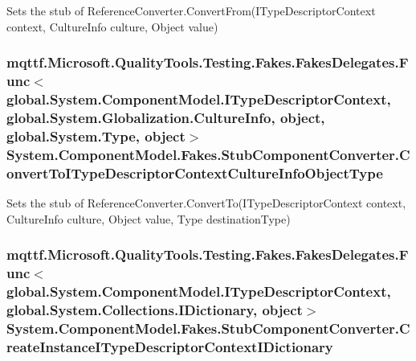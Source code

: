 Sets the stub of Reference\-Converter.\-Convert\-From(\-I\-Type\-Descriptor\-Context context, Culture\-Info culture, Object value)

\hypertarget{class_system_1_1_component_model_1_1_fakes_1_1_stub_component_converter_ae0655af312b0b7d0d8d744f84c0ad83b}{
\subsubsection[{Convert\-To\-I\-Type\-Descriptor\-Context\-Culture\-Info\-Object\-Type}]{\setlength{\rightskip}{0pt plus 5cm}mqttf.\-Microsoft.\-Quality\-Tools.\-Testing.\-Fakes.\-Fakes\-Delegates.\-Func$<$global.\-System.\-Component\-Model.\-I\-Type\-Descriptor\-Context, global.\-System.\-Globalization.\-Culture\-Info, object, global.\-System.\-Type, object$>$ System.\-Component\-Model.\-Fakes.\-Stub\-Component\-Converter.\-Convert\-To\-I\-Type\-Descriptor\-Context\-Culture\-Info\-Object\-Type}}\label{class_system_1_1_component_model_1_1_fakes_1_1_stub_component_converter_ae0655af312b0b7d0d8d744f84c0ad83b}


Sets the stub of Reference\-Converter.\-Convert\-To(\-I\-Type\-Descriptor\-Context context, Culture\-Info culture, Object value, Type destination\-Type)

\hypertarget{class_system_1_1_component_model_1_1_fakes_1_1_stub_component_converter_a267ad55c0dd62cd8a7b62ee942cf9e5b}{
\subsubsection[{Create\-Instance\-I\-Type\-Descriptor\-Context\-I\-Dictionary}]{\setlength{\rightskip}{0pt plus 5cm}mqttf.\-Microsoft.\-Quality\-Tools.\-Testing.\-Fakes.\-Fakes\-Delegates.\-Func$<$global.\-System.\-Component\-Model.\-I\-Type\-Descriptor\-Context, global.\-System.\-Collections.\-I\-Dictionary, object$>$ System.\-Component\-Model.\-Fakes.\-Stub\-Component\-Converter.\-Create\-Instance\-I\-Type\-Descriptor\-Context\-I\-Dictionary}}\label{class_system_1_1_component_model_1_1_fakes_1_1_stub_component_converter_a267ad55c0dd62cd8a7b62ee942cf9e5b}


